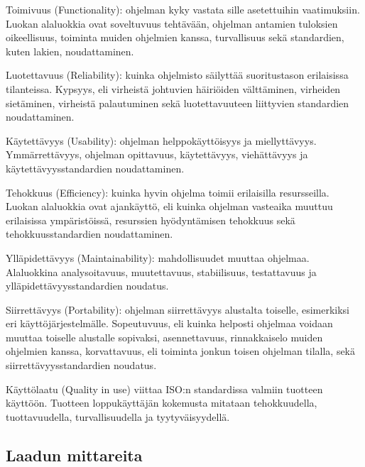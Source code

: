 \documentclass[finnish]{tktltiki2}
\theoremstyle{definition}
\theoremstyle{remark}
\begin{document}
Toimivuus (Functionality): ohjelman kyky vastata sille asetettuihin vaatimuksiin.  Luokan alaluokkia ovat soveltuvuus tehtävään, ohjelman antamien tuloksien oikeellisuus, toiminta muiden ohjelmien kanssa, turvallisuus sekä standardien, kuten lakien, noudattaminen.

Luotettavuus (Reliability): kuinka ohjelmisto säilyttää suoritustason erilaisissa tilanteissa. Kypsyys, eli virheistä johtuvien häiriöiden välttäminen, virheiden sietäminen, virheistä palautuminen sekä luotettavuuteen liittyvien standardien noudattaminen.

 Käytettävyys (Usability): ohjelman helppokäyttöisyys ja miellyttävyys. Ymmärrettävyys, ohjelman opittavuus, käytettävyys, viehättävyys ja käytettävyysstandardien noudattaminen.

Tehokkuus (Efficiency): kuinka hyvin ohjelma toimii erilaisilla resursseilla. Luokan alaluokkia ovat ajankäyttö, eli kuinka ohjelman vasteaika muuttuu erilaisissa ympäristöissä, resurssien hyödyntämisen tehokkuus sekä tehokkuusstandardien noudattaminen.

Ylläpidettävyys (Maintainability): mahdollisuudet muuttaa ohjelmaa. Alaluokkina analysoitavuus, muutettavuus, stabiilisuus, testattavuus ja ylläpidettävyysstandardien noudatus.

Siirrettävyys (Portability): ohjelman siirrettävyys alustalta toiselle, esimerkiksi eri käyttöjärjestelmälle. Sopeutuvuus, eli kuinka helposti ohjelmaa voidaan muuttaa toiselle alustalle sopivaksi, asennettavuus, rinnakkaiselo muiden ohjelmien kanssa, korvattavuus, eli toiminta jonkun toisen ohjelman tilalla, sekä siirrettävyysstandardien noudatus.


Käyttölaatu (Quality in use) viittaa ISO:n standardissa valmiin tuotteen käyttöön. Tuotteen loppukäyttäjän kokemusta mitataan tehokkuudella, tuottavuudella, turvallisuudella ja tyytyväisyydellä.











\subsection{Laadun mittareita}
\end{document}
